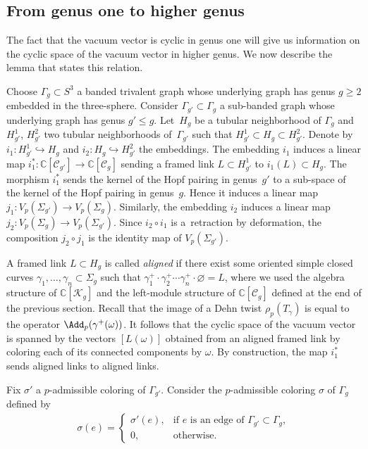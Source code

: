 \subsection{From genus one to higher genus}

The fact that the vacuum vector is cyclic in genus one will give us information on the cyclic space of the vacuum vector in higher genus. We now describe the lemma that states this relation.

Choose $\Gamma_g \subset {S}^3$ a banded trivalent graph whose underlying graph has genus $g\geq 2$ embedded in the three-sphere. Consider $\Gamma_{g'}\subset \Gamma_g$ a sub-banded graph whose underlying graph has genus $g'\leq g$. Let~$H_g$ be a tubular neighborhood of $\Gamma_g$ and $H_{g'}^1$, $H_{g'}^2$ two tubular neighborhoods of~$\Gamma_{g'}$ such that $H_{g'}^1\subset H_g \subset H_{g'}^2$. Denote by $i_1\colon H_{g'}^1 \hookrightarrow H_g$ and $i_2\colon H_g \hookrightarrow H_{g'}^2$ the embeddings. The embedding $i_1$ induces a linear map $i_1^*\colon \mathbb{C}[\mathcal{C}_{g'}] \rightarrow \mathbb{C}[\mathcal{C}_g]$ sending a framed link $L\subset H_{g'}^1$ to $i_1(L) \subset H_g$. The morphism $i_1^*$ sends the kernel of the Hopf pairing in genus~$g'$ to a sub-space of the kernel of the Hopf pairing in genus~$g$. Hence it induces a linear map $j_1 \colon V_p(\Sigma_{g'}) \rightarrow V_p(\Sigma_g)$. Similarly, the embedding $i_2$ induces a linear map $j_2\colon V_p(\Sigma_g) \rightarrow V_p(\Sigma_{g'})$. Since $i_2 \circ i_1$ is a~retraction by deformation, the composition $j_2\circ j_1$ is the identity map of $V_p(\Sigma_{g'})$.

A framed link $L\subset H_g$ is called \textit{aligned} if there exist some oriented simple closed curves $\gamma_1, \ldots, \gamma_n\subset \Sigma_g$ such that $\gamma_1^+ \cdot \gamma_2^+ \cdots \gamma_n^+ \cdot \varnothing = L$, where we used the algebra structure of $\mathbb{C}[\mathcal{K}_g]$ and the left-module structure of $\mathbb{C}[\mathcal{C}_g]$ defined at the end of the previous section. Recall that the image of a Dehn twist $\rho_p(T_{\gamma})$ is equal to the operator $\Add_p(\gamma^+(\omega))$. It follows that the cyclic space of the vacuum vector is spanned by the vectors $[L(\omega)]$ obtained from an aligned framed link by coloring each of its connected components by $\omega$. By construction, the map $i_1^*$ sends aligned links to aligned links.

Fix $\sigma'$ a $p$-admissible coloring of $\Gamma_{g'}$. Consider the $p$-admissible coloring $\sigma$ of $\Gamma_g$ defined by
\begin{gather*} \sigma(e)= \begin{cases}
\sigma'(e), & \text{if $e$ is an edge of $\Gamma_{g'}\subset \Gamma_g$},\\
0, & \text{otherwise}.
\end{cases}\end{gather*}

